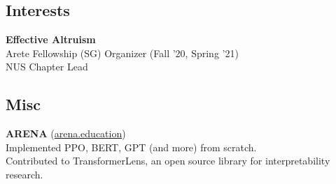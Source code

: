 \documentclass[]{deedy-resume-openfont}
\begin{document}
\begin{minipage}[t]{0.29\textwidth}
    \subsection{Interests}
    \textbf{Effective Altruism} \\
    Arete Fellowship (SG) Organizer (Fall '20, Spring '21)\\
    NUS Chapter Lead\\
    \sectionsep
    
    \subsection{Misc}
    \textbf{ARENA} (\href{https://www.arena.education/}{arena.education})\\
    \textbullet{} Implemented PPO, BERT, GPT (and more) from scratch. \\
    \textbullet{} Contributed to TransformerLens, an open source library for interpretability research.
    
    
    \end{minipage} 
    \hfill
\end{document}

